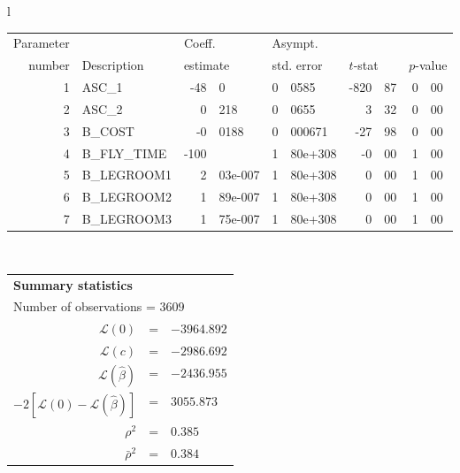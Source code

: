   \begin{tabular}{l}
\begin{tabular}{rlr@{.}lr@{.}lr@{.}lr@{.}l}
Parameter &                       &   \multicolumn{2}{l}{Coeff.}      & \multicolumn{2}{l}{Asympt.}  &     \multicolumn{4}{l}{}   \\
number &  Description                     &   \multicolumn{2}{l}{estimate}      & \multicolumn{2}{l}{std. error}  &   \multicolumn{2}{l}{$t$-stat}  &   \multicolumn{2}{l}{$p$-value}   \\

\hline

1 & ASC\_1 & -48&0 & 0&0585 & -820&87 & 0&00 \\
2 & ASC\_2 & 0&218 & 0&0655 & 3&32 & 0&00 \\
3 & B\_COST & -0&0188 & 0&000671 & -27&98 & 0&00 \\
4 & B\_FLY\_TIME & -100& & 1&80e+308 & -0&00 & 1&00 \\
5 & B\_LEGROOM1 & 2&03e-007 & 1&80e+308 & 0&00 & 1&00 \\
6 & B\_LEGROOM2 & 1&89e-007 & 1&80e+308 & 0&00 & 1&00 \\
7 & B\_LEGROOM3 & 1&75e-007 & 1&80e+308 & 0&00 & 1&00 \\
\hline

\end{tabular}
\\
\begin{tabular}{rcl}
\multicolumn{3}{l}{\bf Summary statistics}\\
\multicolumn{3}{l}{ Number of observations = $3609$} \\
 $\mathcal{L}(0)$ &=&  $-3964.892$ \\
 $\mathcal{L}(c)$ &=& $-2986.692$\\
 $\mathcal{L}(\hat{\beta})$ &=& $-2436.955 $  \\
 $-2[\mathcal{L}(0) -\mathcal{L}(\hat{\beta})]$ &=& $3055.873$ \\
    $\rho^2$ &=&   $0.385$ \\
    $\bar{\rho}^2$ &=&    $0.384$ \\
\end{tabular}
\end{tabular}

